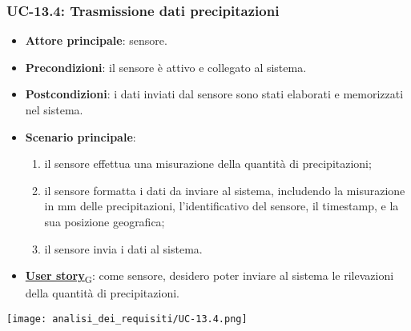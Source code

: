 \subsubsection{UC-13.4: Trasmissione dati precipitazioni}
\begin{itemize}
	\item \textbf{Attore principale}: sensore.
	\item \textbf{Precondizioni}: il sensore è attivo e collegato al sistema.
	\item \textbf{Postcondizioni}: i dati inviati dal sensore sono stati elaborati e memorizzati nel sistema.
	\item \textbf{Scenario principale}:
	      \begin{enumerate}
		      \item il sensore effettua una misurazione della quantità di precipitazioni;
		      \item il sensore formatta i dati da inviare al sistema, includendo la misurazione in mm delle precipitazioni, l'identificativo del sensore,
		            il timestamp, e la sua posizione geografica;
		      \item il sensore invia i dati al sistema.
	      \end{enumerate}
	\item \href{https://7last.github.io/docs/rtb/documentazione-interna/glossario\#user-story}{\textbf{User story}\textsubscript{G}}: come sensore, desidero poter inviare al sistema le rilevazioni della quantità di precipitazioni.
\end{itemize}

\begin{center}
	\texttt{[image: analisi\_dei\_requisiti/UC-13.4.png]}
\end{center}
